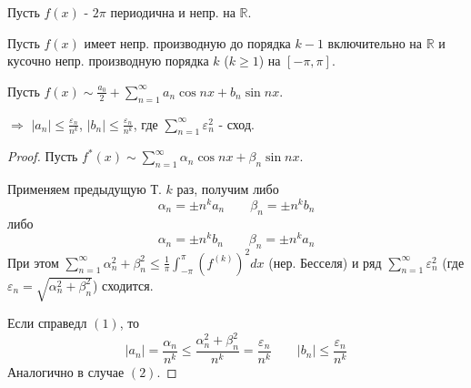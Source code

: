 \documentclass{article}
\theoremstyle{definition}
\numberwithin{theorem}{section}
\numberwithin{lemma}{section}
\numberwithin{definition}{section}
\numberwithin{corollary}{section}
\numberwithin{equation}{section}
\let\epsilon\varepsilon
\let\implies\Rightarrow
\newcommand\R{\ensuremath{\mathbb{R}}}
\begin{document}
\begin{lemma}
  Пусть $f(x)$ - $2\pi$ периодична и непр. на $\R$.

  Пусть $f(x)$ имеет непр. производную до порядка $k-1$ включительно на $\R$
  и кусочно непр. производную порядка $k$ ($k\ge 1$) на $[-\pi,\pi]$.

  Пусть $f(x) \sim \frac{a_0}{2}+\sum_{n=1}^{\infty}a_n\cos nx + b_n \sin nx$.

  $\implies$ $|a_n| \le \frac{\epsilon_n}{n^{k}}$, $|b_n| \le \frac{\epsilon_n}{n^{k}}$,
  где $\sum_{n=1}^{\infty}\epsilon_n^{2}$ - сход.
\end{lemma}
\begin{proof}
  Пусть $f^{*}(x)\sim \sum_{n=1}^{\infty}\alpha_n\cos nx + \beta_n \sin nx$.

  Применяем предыдущую Т. $k$ раз, получим
  либо
  \[
    \alpha_n=\pm n^{k}a_n \qquad
    \beta_n=\pm n^{k} b_n \tag{$1$}
  \]
  либо
  \[
    \alpha_n=\pm n^{k}b_n \qquad
    \beta_n=\pm n^{k} a_n \tag{$2$}
  \]
  При этом $\sum_{n=1}^{\infty}\alpha_n^{2}+\beta_n^{2} \le \frac{1}{\pi}\int_{-\pi}^{\pi}(f^{(k)})^{2}dx$
  (нер. Бесселя) и ряд $\sum_{n=1}^{\infty}\epsilon_n^{2}$ (где $\epsilon_n = \sqrt{\alpha_n^{2}+\beta_n^{2}}$)
  сходится.

  Если справедл $(1)$, то
  \[
    |a_n|=\frac{\alpha_n}{n^{k}} \le \frac{\alpha_n^{2}+\beta_n^{2}}{n^{k}}=\frac{\epsilon_n}{n^{k}} \qquad |b_n| \le \frac{\epsilon_n}{n^{k}}
  \]
  Аналогично в случае $(2)$.
\end{proof}
\end{document}
